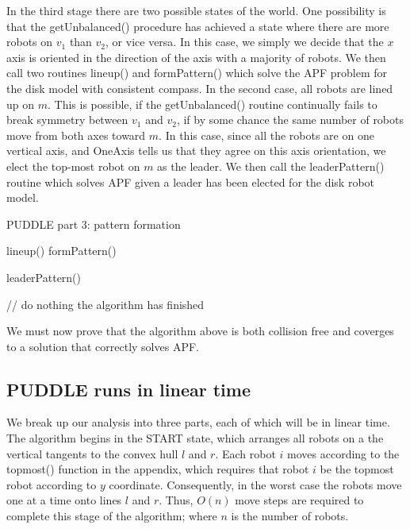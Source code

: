 \documentclass[preprint,10pt]{elsarticle}
\begin{document}
	In the third stage there are two possible states of the world. One possibility is that the getUnbalanced() procedure
	has achieved a state where there are more robots on $v_1$ than $v_2$, or vice versa. In
	this case, we simply we decide that the $x$ axis is oriented in the direction of the axis with a majority
	of robots. We then call two routines lineup() and formPattern() which solve the APF problem for the disk 
	model with consistent compass. In the second case, all robots are lined up on $m$. This is possible, if
	the getUnbalanced() routine continually fails to break symmetry between $v_1$ and $v_2$, if by some
	chance the same number of robots move from both axes toward $m$. In this case, since all the robots
	are on one vertical axis, and OneAxis tells us that they agree on this axis orientation, we elect
	the top-most robot on $m$ as the leader. We then call the leaderPattern() routine which solves
	APF given a leader has been elected for the disk robot model.
	
	\begin{algorithm}[H]
	\begin{algorithmic}
		\caption{PUDDLE part 3: pattern formation}

			\State
				\State lineup()
				\State formPattern()
			\EndCase

			\State
				\State leaderPattern()
			\EndCase

			\State
				\State // do nothing the algorithm has finished
			\EndCase
		\EndSwitch

	\EndProcedure
	\end{algorithmic}
	\end{algorithm}
	
	We must now prove that the algorithm above is both collision free and coverges to a solution
	that correctly solves APF.
	\subsection{PUDDLE runs in linear time} 
		We break up our analysis into three parts, each of which will be in linear time. The algorithm
		begins in the START state, which arranges all robots on a the vertical tangents to the convex
		hull $l$ and $r$. Each robot $i$ moves according to the topmost() function in the appendix, which requires
		that robot $i$ be the topmost robot according to $y$ coordinate. Consequently, in the worst case 
		the robots move one	at a time onto lines $l$ and $r$. Thus, $O(n)$ move steps are required to 
		complete this stage of the algorithm; where $n$ is the number of robots.
\end{document}
